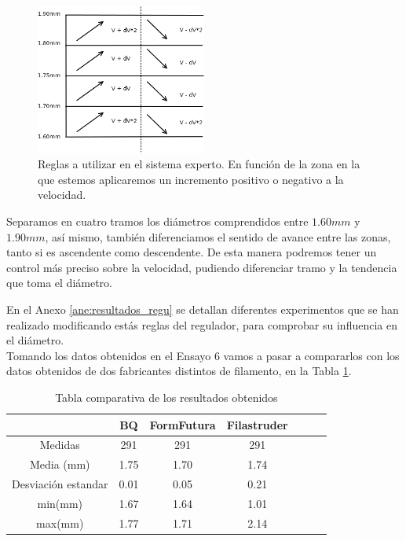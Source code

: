 \begin{figure}[H]
    \centering
    \includegraphics[width=0.5\textwidth]{images/producciones/11082015/Diagram1.png}
    \caption[Reglas a utilizar en el sistema experto.]{Reglas a utilizar en el sistema experto. En función de la zona en la que estemos aplicaremos un incremento positivo o negativo a la velocidad.}
    \label{fig:reg_reglas}
\end{figure}

Separamos en cuatro tramos los diámetros comprendidos entre $1.60mm$ y $1.90mm$, así mismo, también diferenciamos el sentido de avance entre las zonas, tanto si es ascendente como descendente. De esta manera podremos tener un control más preciso sobre la velocidad, pudiendo diferenciar tramo y la tendencia que toma el diámetro.

En el Anexo \ref{ane:resultados_regu} se detallan diferentes experimentos que se han realizado modificando estás reglas del regulador, para comprobar su influencia en el diámetro.\\

Tomando los datos obtenidos en el Ensayo 6  vamos a pasar a compararlos con los datos obtenidos de dos fabricantes distintos de filamento, en la Tabla \ref{tab:compara_results}.

\begin{table}[H]
	\centering
	\begin{tabular}{ccccccc}
		                    & BQ & FormFutura & Filastruder \\ \hline
		Medidas             & 291      &291       & 291      \\
		Media (mm)          & 1.75     & 1.70     & 1.74      \\
		Desviación estandar & 0.01     & 0.05     & 0.21      \\
		min(mm)             & 1.67     & 1.64     & 1.01      \\
		max(mm)             & 1.77     & 1.71     & 2.14     
	\end{tabular}
	\caption{Tabla comparativa de los resultados obtenidos}
	\label{tab:compara_results}
\end{table}

